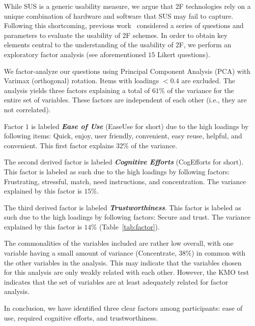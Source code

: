 \documentclass[conference]{IEEEtran}
\begin{document}
While SUS is a generic usability measure, we argue that 2F technologies rely on a unique combination of hardware and software that SUS may fail to capture. Following this shortcoming, previous work~\cite{bonneau2012quest,braz2006security,gunson2011user,karole2011comparative,weir2009user,weir2010usable} considered a series of questions and parameters to evaluate the usability of  2F schemes. In order to obtain key elements central to the understanding of the usability of 2F, we perform an exploratory factor analysis (see aforementioned $15$ Likert questions). 

We factor-analyze our questions using Principal Component Analysis (PCA) with Varimax (orthogonal) rotation. Items with loadings $< 0.4$ are excluded. The analysis yields three factors explaining a total of $61\%$ of the variance for the entire set of variables. These factors are independent of each other (i.e., they are not correlated).

Factor $1$ is labeled \textbf{\em Ease of Use} (EaseUse for short) due to the high loadings by following items: \textsf{\small Quick}, \textsf{\small enjoy}, \textsf{\small user friendly}, \textsf{\small convenient}, \textsf{\small easy reuse}, \textsf{\small helpful}, and \textsf{\small convenient}. This first factor explains $32\%$ of the variance. 

The second derived factor is labeled \textbf{\em Cognitive Efforts} (CogEfforts for short). This factor is labeled as such due to the high loadings by following factors: \textsf{\small Frustrating}, \textsf{\small stressful}, \textsf{\small match}, \textsf{\small need instructions}, and \textsf{\small concentration}. The variance explained by this factor is $15\%$. 

The third derived factor is labeled \textbf{\em Trustworthiness}. This factor is labeled as such due to the high loadings by following factors: \textsf{\small Secure} and \textsf{\small trust}. The variance explained by this factor is $14\%$ (Table~\ref{tab:factor}).

The commonalities of the variables included are rather low overall, with one variable having a small amount of variance (\textsf{\small Concentrate}, $38\%$) in common with the other variables in the analysis. This may indicate that the variables chosen for this analysis are only weakly related with each other. However, the KMO test indicates that the set of variables are at least adequately related for factor analysis.

In conclusion, we have identified three clear factors among participants: ease of use, required cognitive efforts, and trustworthiness.
\end{document}
